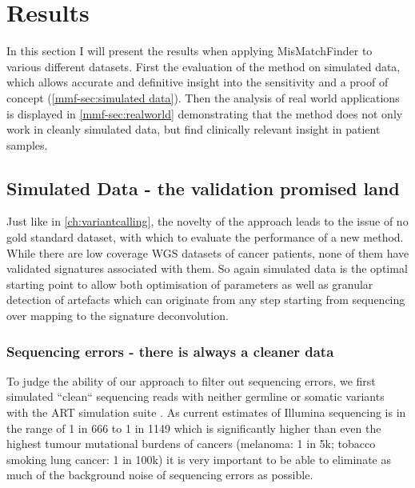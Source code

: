 
\section{Results}
\label{mmf-sec:results}
In this section I will present the results when applying MisMatchFinder to various different datasets. First the evaluation of the method on simulated data, which allows accurate and definitive insight into the sensitivity and a proof of concept (\autoref{mmf-sec:simulated data}). Then the analysis of real world applications is displayed in \autoref{mmf-sec:realworld} demonstrating that the method does not only work in cleanly simulated data, but find clinically relevant insight in patient samples.

\subsection{Simulated Data - the validation promised land}
\label{mmf-sec:simulated data}
Just like in \autoref{ch:variantcalling}, the novelty of the approach leads to the issue of no gold standard dataset, with which to evaluate the performance of a new method. While there are low coverage WGS datasets of cancer patients, none of them have validated signatures associated with them. So again simulated data is the optimal starting point to allow both optimisation of parameters as well as granular detection of artefacts which can originate from any step starting from sequencing over mapping to the signature deconvolution. 

\subsubsection{Sequencing errors - there is always a cleaner data}
\label{mmf-sec:cleanSim}
To judge the ability of our approach to filter out sequencing errors, we first simulated ``clean`` sequencing reads with neither germline or somatic variants with the ART simulation suite \cite{Huang2011}. As current estimates of Illumina sequencing is in the range of 1 in 666 to 1 in 1149 \cite{Stoler2021} which is significantly higher than even the highest tumour mutational burdens of  cancers (melanoma: 1 in 5k; tobacco smoking lung cancer: 1 in 100k) it is very important to be able to eliminate as much of the  background noise of sequencing errors as possible.

